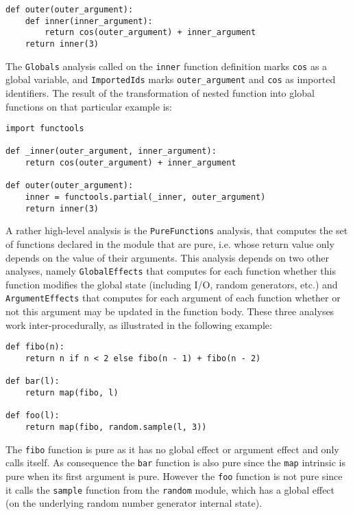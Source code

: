 \documentclass[10pt, onecolumn, preprint]{sigplanconf}
\begin{document}
\begin{lstlisting}
def outer(outer_argument):
    def inner(inner_argument):
        return cos(outer_argument) + inner_argument
    return inner(3)
\end{lstlisting}

The \texttt{Globals} analysis called on the \texttt{inner} function definition
marks \texttt{cos} as a global variable, and \texttt{ImportedIds} marks
\texttt{outer\_argument} and \texttt{cos} as imported identifiers. The result
of the transformation of nested function into global functions on that
particular example is:

\begin{lstlisting}
import functools

def _inner(outer_argument, inner_argument):
    return cos(outer_argument) + inner_argument

def outer(outer_argument):
    inner = functools.partial(_inner, outer_argument)
    return inner(3)
\end{lstlisting}

A rather high-level analysis is the \texttt{PureFunctions} analysis, that computes the
set of functions declared in the module that are pure, i.e. whose return value
only depends on the value of their arguments. This analysis depends on two
other analyses, namely \texttt{GlobalEffects} that computes for each function whether
this function modifies the global state (including I/O, random generators, etc.)
and \texttt{ArgumentEffects} that computes for each argument of each function 
whether or not this argument may be updated in the function body. These three
analyses work inter-procedurally, as illustrated in the following example:

\begin{lstlisting}
def fibo(n):
    return n if n < 2 else fibo(n - 1) + fibo(n - 2)

def bar(l):
    return map(fibo, l)

def foo(l):
    return map(fibo, random.sample(l, 3))
\end{lstlisting}

The \texttt{fibo} function is pure as it has no global effect or argument effect and
only calls itself. As consequence the \texttt{bar} function is also pure since the
\texttt{map} intrinsic is pure when its first argument is pure. However the \texttt{foo}
function is not pure since it calls the \texttt{sample} function from the \texttt{random}
module, which has a global effect (on the underlying random number generator
internal state).
\end{document}
